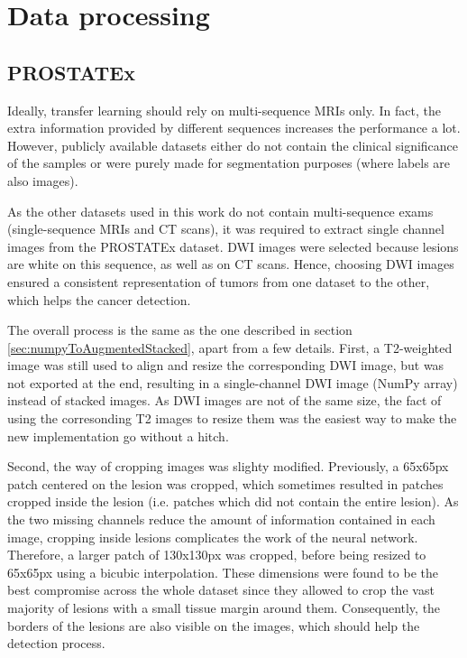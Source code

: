 \section{Data processing}
\subsection{PROSTATEx}
\label{sec:PROSTATEx}
\setlength{\marginparwidth}{3cm}\leavevmode {}Ideally, transfer learning should rely on multi-sequence MRIs only. In fact, the extra information provided by different sequences increases the performance a lot. However, publicly available datasets either do not contain the clinical significance of the samples or were purely made for segmentation purposes (where labels are also images).

As the other datasets used in this work do not contain multi-sequence exams (single-sequence MRIs and CT scans), it was required to extract single channel images from the PROSTATEx dataset. DWI images were selected because lesions are white on this sequence, as well as on CT scans. Hence, choosing DWI images ensured a consistent representation of tumors from one dataset to the other, which helps the cancer detection.

The overall process is the same as the one described in section \ref{sec:numpyToAugmentedStacked}, apart from a few details. First, a T2-weighted image was still used to align and resize the corresponding DWI image, but was not exported at the end, resulting in a single-channel DWI image (NumPy array) instead of stacked images. As DWI images are not of the same size, the fact of using the corresonding T2 images to resize them was the easiest way to make the new implementation go without a hitch.

Second, the way of cropping images was slighty modified. Previously, a 65x65px patch centered on the lesion was cropped, which sometimes resulted in patches cropped inside the lesion (i.e. patches which did not contain the entire lesion). As the two missing channels reduce the amount of information contained in each image, cropping inside lesions complicates the work of the neural network. Therefore, a larger patch of 130x130px was cropped, before being resized to 65x65px using a bicubic interpolation. These dimensions were found to be the best compromise across the whole dataset since they allowed to crop the vast majority of lesions with a small tissue margin around them. Consequently, the borders of the lesions are also visible on the images, which should help the detection process. 


